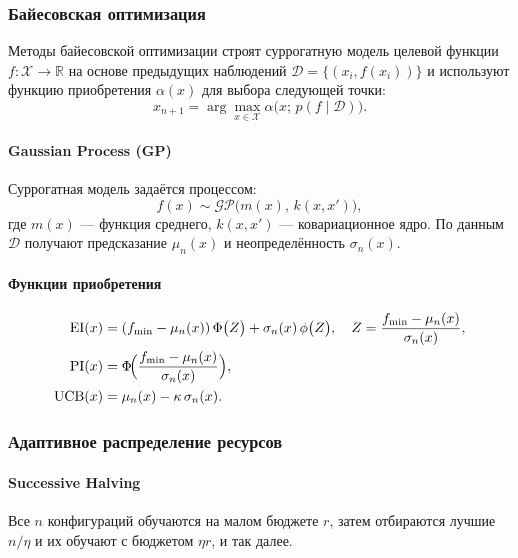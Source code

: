 \subsubsection{Байесовская оптимизация}

Методы байесовской оптимизации строят суррогатную модель целевой функции
\(
f\colon \mathcal{X}\to\mathbb{R}
\)
на основе предыдущих наблюдений \(\mathcal{D}=\{(x_i, f(x_i))\}\) и используют функцию приобретения \(\alpha(x)\) для выбора следующей точки:
\begin{equation}
x_{n+1} = \arg\max_{x\in\mathcal{X}} \alpha\bigl(x;\,p(f\mid\mathcal{D})\bigr).
\label{eq:bayes-opt}
\end{equation}

\paragraph{Gaussian Process (GP)}  
Суррогатная модель задаётся процессом:
\begin{equation}
f(x)\sim\mathcal{GP}\bigl(m(x),\,k(x,x')\bigr),
\label{eq:gp-prior}
\end{equation}
где \(m(x)\) — функция среднего, \(k(x,x')\) — ковариационное ядро. По данным \(\mathcal{D}\) получают предсказание \(\mu_n(x)\) и неопределённость \(\sigma_n(x)\).

\paragraph{Функции приобретения}  
\begin{align}
\mathrm{EI}(x)
&= (f_{\min}-\mu_n(x))\,\Phi\bigl(Z\bigr)
+ \sigma_n(x)\,\phi\bigl(Z\bigr),
\quad Z = \frac{f_{\min}-\mu_n(x)}{\sigma_n(x)},
\label{eq:expected-improvement}\\
\mathrm{PI}(x)
&= \Phi\!\Bigl(\frac{f_{\min}-\mu_n(x)}{\sigma_n(x)}\Bigr),
\label{eq:probability-improvement}\\
\mathrm{UCB}(x)
&= \mu_n(x) - \kappa\,\sigma_n(x).
\label{eq:upper-conf-bound}
\end{align}

\subsubsection{Адаптивное распределение ресурсов}

\paragraph{Successive Halving}  
Все \(n\) конфигураций обучаются на малом бюджете \(r\), затем отбираются лучшие \(n/\eta\) и их обучают с бюджетом \(\eta r\), и так далее.

